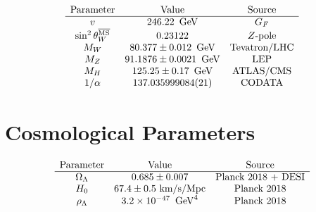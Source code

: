 \[
\begin{array}{ccc}
\text{Parameter} & \text{Value} & \text{Source} \\
\hline
v & 246.22\ \,\text{GeV} & G_F \\
\sin^2\theta_W^{\overline{\text{MS}}} & 0.23122 & Z\text{-pole} \\
M_W & 80.377 \pm 0.012\ \,\text{GeV} & \text{Tevatron/LHC} \\
M_Z & 91.1876 \pm 0.0021\ \,\text{GeV} & \text{LEP} \\
M_H & 125.25 \pm 0.17\ \,\text{GeV} & \text{ATLAS/CMS} \\
1/\alpha & 137.035999084(21) & \text{CODATA} \\
\end{array}
\]

\section{Cosmological Parameters}

\[
\begin{array}{ccc}
\text{Parameter} & \text{Value} & \text{Source} \\
\hline
\Omega_\Lambda & 0.685 \pm 0.007 & \text{Planck 2018 + DESI} \\
H_0 & 67.4 \pm 0.5\ \text{km/s/Mpc} & \text{Planck 2018} \\
\rho_\Lambda & 3.2 \times 10^{-47}\ \,\text{GeV}^4 & \text{Planck 2018} \\
\end{array}
\]
